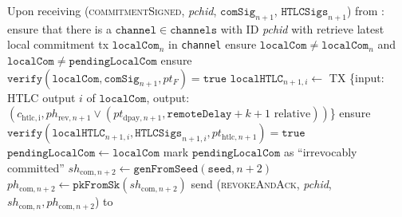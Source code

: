 \begin{algorithmic}[1]
    \State Upon receiving (\textsc{commitmentSigned}, \textit{pchid},
    $\mathtt{comSig}_{n+1}$, $\mathtt{HTLCSigs}_{n+1}$) from \bob:
    \Indent
      \State ensure that there is a $\mathtt{channel} \in \mathtt{channels}$
      with ID \textit{pchid} with \bob
      \State retrieve latest local commitment tx $\mathtt{localCom}_n$ in
      \texttt{channel}
      \State ensure $\mathtt{localCom} \neq \mathtt{localCom}_n$ and
      $\mathtt{localCom} \neq \mathtt{pendingLocalCom}$
      \State ensure $\mathtt{verify}\left(\mathtt{localCom},
      \mathtt{comSig}_{n+1}, pt_F\right) = \mathtt{true}$
        \State $\mathtt{localHTLC}_{n+1, i} \gets$ TX \{input: HTLC output $i$
        of $\mathtt{localCom}$, output: $\left(c_{\mathrm{htlc, i}},
        ph_{\mathrm{rev}, n+1} \vee \left(pt_{\mathrm{dpay}, n+1},
        \mathtt{remoteDelay} + k + 1 \text{ relative}\right)\right)$\}
        \State ensure $\mathtt{verify}\left(\mathtt{localHTLC}_{n+1, i},
        \mathtt{HTLCSigs}_{n+1, i}, pt_{\mathrm{htlc}, n+1}\right) =
        \mathtt{true}$
      \EndFor
      \State $\mathtt{pendingLocalCom} \gets \mathtt{localCom}$
      \State mark $\mathtt{pendingLocalCom}$ as ``irrevocably committed''
      \State $sh_{\mathrm{com}, n+2} \gets
      \texttt{genFromSeed}\left(\mathtt{seed}, n+2\right)$
      \State $ph_{\mathrm{com}, n+2} \gets
      \mathtt{pkFromSk}\left(sh_{\mathrm{com}, n+2}\right)$
      \State send (\textsc{revokeAndAck}, \textit{pchid}, $sh_{\mathrm{com}, n},
      ph_{\mathrm{com}, n+2}$) to \bob
    \EndIndent
    \State


\end{algorithmic}
